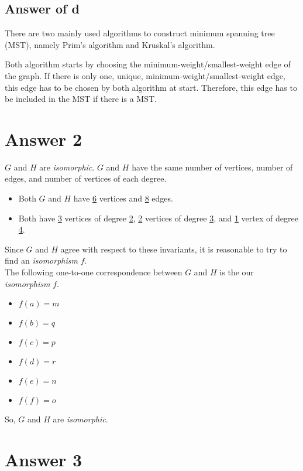 \documentclass[12pt]{article}
\begin{document}
\subsection*{Answer of d}

There are two mainly used algorithms to construct minimum spanning tree (MST), namely Prim's algorithm and Kruskal's algorithm. 

\noindent Both algorithm starts by choosing the minimum-weight/smallest-weight edge of the graph. If there is only one, unique, minimum-weight/smallest-weight edge, this edge has to be chosen by both algorithm at start. Therefore, this edge has to be included in the MST if there is a MST.


\newpage
\section*{Answer 2}

\noindent $G$ and $H$ are \textit{isomorphic}. $G$ and $H$ have the same number of vertices, number of edges, and number of vertices of each degree.

\begin{itemize}
    \item Both $G$ and $H$ have \underline{6} vertices and \underline{8} edges.
    \item Both have \underline{3} vertices of degree \underline{2}, \underline{2} vertices of degree \underline{3}, and \underline{1} vertex of degree \underline{4}.
\end{itemize}
Since $G$ and $H$ agree with respect to these invariants, it is reasonable to try to find an \textit{isomorphism} $f$.\\

\noindent The following one-to-one correspondence between $G$ and $H$ is the our \textit{isomorphism} $f$.

\begin{itemize}
    \item $f(a) = m$
    \item $f(b) = q$
    \item $f(c) = p$
    \item $f(d) = r$
    \item $f(e) = n$
    \item $f(f) = o$
\end{itemize}
So, $G$ and $H$ are \textit{isomorphic}.


\newpage
\section*{Answer 3}
\end{document}
